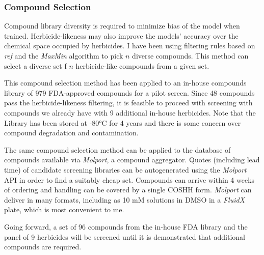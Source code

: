 \documentclass{article}
\begin{document}
\subsubsection{Compound Selection}
Compound library diversity is required to minimize bias of the model when trained. Herbicide-likeness may also improve the models' accuracy over the chemical space occupied by herbicides. %
I have been using filtering rules based on \textit{ref} and the \textit{MaxMin} algorithm to pick $n$ diverse compounds. This method can select a diverse set f $n$ herbicide-like compounds from a given set. %
\par
This compound selection method has been applied to an in-house compounds library of 979 FDA-approved compounds for a pilot screen. Since 48 compounds pass the herbicide-likeness filtering, it is feasible to proceed with screening with compounds we already have with 9 additional in-house herbicides. Note that the Library has been stored at -80°C for 4 years and there is some concern over compound degradation and contamination. %
\par
The same compound selection method can be applied to the database of compounds available via \textit{Molport}, a compound aggregator. Quotes (including lead time) of candidate screening libraries can be autogenerated using the \textit{Molport} API in order to find a suitably cheap set. Compounds can arrive within 4 weeks of ordering and handling can be covered by a single COSHH form. \textit{Molport} can deliver in many formats, including as 10 mM solutions in DMSO in a \textit{FluidX} plate, which is most convenient to me. %
\par
Going forward, a set of 96 compounds from the in-house FDA library and the panel of 9 herbicides will be screened until it is demonstrated that additional compounds are required. %
\end{document}
